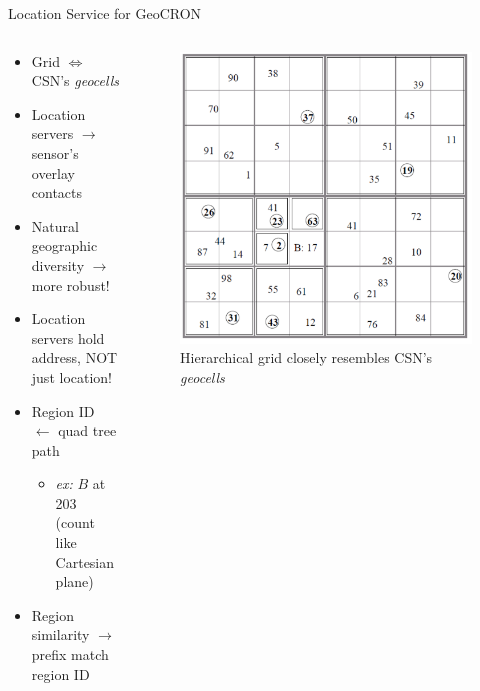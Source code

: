 \documentclass[pdftex]{beamer}
\begin{document}
\begin{frame}{Location Service for GeoCRON}
\begin{columns}
\begin{column}{.5\textwidth}

	\begin{itemize}
		\item Grid $\Leftrightarrow$ CSN's \emph{geocells}
		\item Location servers $\rightarrow$ sensor's overlay contacts
		\item Natural geographic diversity $\rightarrow$ more robust!
		\item Location servers hold address, NOT just location!
		\item Region ID $\leftarrow$ quad tree path
		\vspace{-12pt} %
		\begin{itemize}
			\item \emph{ex:} $B$ at 203 (count like Cartesian plane)
		\end{itemize}
		\item Region similarity $\rightarrow$ prefix match region ID
	\end{itemize}

\end{column}

\begin{column}{.5\textwidth}
\begin{figure}
\includegraphics[width=\textwidth]{location_service}
\caption{Hierarchical grid closely resembles CSN's \emph{geocells}}
\end{figure}
\end{column}
\end{columns}
\end{frame}
\end{document}
